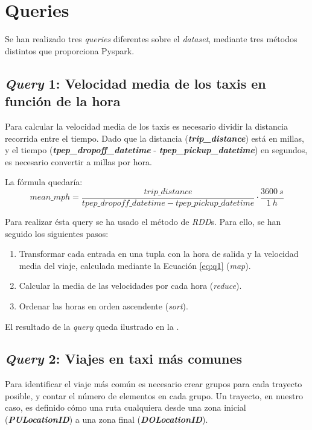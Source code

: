 \section{Queries}
Se han realizado tres \textit{queries} diferentes sobre el \textit{dataset}, mediante tres métodos distintos que proporciona Pyspark.


\subsection{\textit{Query} 1: Velocidad media de los taxis en función de la hora}
Para calcular la velocidad media de los taxis es necesario dividir la distancia recorrida entre el tiempo. Dado que la distancia (\textbf{\textit{trip\_distance}}) está en millas, y el tiempo (\textbf{\textit{tpep\_dropoff\_datetime}} - \textbf{\textit{tpep\_pickup\_datetime}}) en segundos, es necesario convertir a millas por hora.

La fórmula quedaría:
\begin{equation}\label{eq:q1}
  mean\_mph = \frac{trip\_distance}{tpep\_dropoff\_datetime - tpep\_pickup\_datetime} \cdot \frac{3600\ s}{1\ h}
\end{equation}


Para realizar ésta query se ha usado el método de \textit{RDD}s. Para ello, se han seguido los siguientes pasos:
\begin{enumerate}
  \item Transformar cada entrada en una tupla con la hora de salida y la velocidad media del viaje, calculada mediante la Ecuación \ref{eq:q1} (\textit{map}).
  \item Calcular la media de las velocidades por cada hora (\textit{reduce}).
  \item Ordenar las horas en orden ascendente (\textit{sort}).
\end{enumerate}

\noindent
El resultado de la \textit{query} queda ilustrado en la .




\subsection{\textit{Query} 2: Viajes en taxi más comunes}
Para identificar el viaje más común es necesario crear grupos para cada trayecto posible, y contar el número de elementos en cada grupo.
Un trayecto, en nuestro caso, es definido cómo una ruta cualquiera desde una zona inicial (\textbf{\textit{PULocationID}}) a una zona final (\textbf{\textit{DOLocationID}}).

